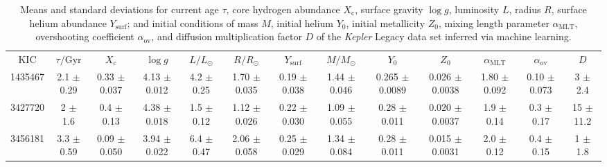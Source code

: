 \begin{table}[H]
    \centering
    \caption{Means and standard deviations for current age $\tau$, core hydrogen abundance $X_{\mathrm{c}}$, surface gravity $\log g$, luminosity $L$, radius $R$, surface helium abundance $Y_{\mathrm{surf}}$; and initial conditions of mass $M$, initial helium $Y_0$, initial metallicity $Z_0$, mixing length parameter $\alpha_{\mathrm{MLT}}$, overshooting coefficient $\alpha_{\mathrm{ov}}$, and diffusion multiplication factor $D$ of the \emph{Kepler} Legacy data set inferred via machine learning.}
    \label{tab:results}
    \fontsize{8}{8}\selectfont%
    \begin{tabular}{c|cccccc|cccccc}
        \hline\noalign{\smallskip}
        KIC & $\tau/$Gyr & $X_{\mathrm{c}}$ & $\log g$ & $L/L_\odot$ & $R/R_\odot$ & $Y_{\mathrm{surf}}$ & $M/M_\odot$ & $Y_0$ & $Z_0$ & $\alpha_{\mathrm{MLT}}$ & $\alpha_{\mathrm{ov}}$ & $D$ \\
        \noalign{\smallskip}\hline\noalign{\smallskip}
1435467  &        2.1    $\pm$  0.29   &      0.33   $\pm$  0.037  &      4.13   $\pm$  0.012  &      4.2    $\pm$  0.25   &      1.70   $\pm$  0.035  &      0.19   $\pm$  0.038    &        1.44   $\pm$  0.046    &        0.265  $\pm$  0.0089   &        0.026  $\pm$  0.0038   &        1.80   $\pm$  0.092    &        0.10   $\pm$  0.073    &        3      $\pm$  2.4      \\
3427720  &        2      $\pm$  1.6    &      0.4    $\pm$  0.13   &      4.38   $\pm$  0.018  &      1.5    $\pm$  0.12   &      1.12   $\pm$  0.026  &      0.22   $\pm$  0.030    &        1.09   $\pm$  0.055    &        0.28   $\pm$  0.011    &        0.020  $\pm$  0.0037   &        1.9    $\pm$  0.14     &        0.3    $\pm$  0.17     &       15      $\pm$ 11.2      \\
3456181  &        3.3    $\pm$  0.59   &      0.09   $\pm$  0.050  &      3.94   $\pm$  0.022  &      6.4    $\pm$  0.47   &      2.06   $\pm$  0.058  &      0.25   $\pm$  0.029    &        1.34   $\pm$  0.084    &        0.28   $\pm$  0.011    &        0.015  $\pm$  0.0031   &        2.0    $\pm$  0.12     &        0.4    $\pm$  0.15     &        1      $\pm$  1.8      \\

\end{tabular}
\end{table}
